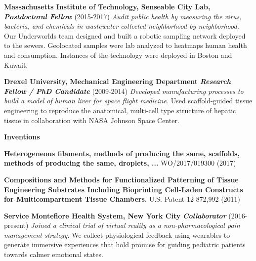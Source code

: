\documentclass[11pt]{article}
\begin{document}
\begin{singlespace}
\begin{flushleft}
\vskip 0.05in
\textbf{Massachusetts Institute of Technology, Senseable City Lab, }
\textit{ \textbf{Postdoctoral Fellow}} (2015-2017) \textit{Audit public health by measuring the virus, bacteria, and chemicals in wastewater collected neighborhood by neighborhood.} Our Underworlds team designed and built a robotic sampling network deployed to the sewers. Geolocated samples were lab analyzed to heatmaps human health and consumption. Instances of the technology were deployed in Boston and Kuwait.

\vskip 0.05in
\textbf{Drexel University, Mechanical Engineering Department}
\textit{ \textbf{Research Fellow / PhD Candidate} } (2009-2014) \textit{Developed manufacturing processes to build a model of human liver for space flight medicine.} Used scaffold-guided tissue engineering to reproduce the anatomical, multi-cell type structure of hepatic tissue in collaboration with NASA Johnson Space Center.

\vskip 0.01in \hfill \break

 \vspace{-1.5em}
\textbf{\Large Inventions}  \vspace{-1em}
\vskip 0.2in

\textbf{Heterogeneous filaments, methods of producing the same, scaffolds, methods of producing the same, droplets, ...} WO/2017/019300 (2017) \href{https://patentscope.wipo.int/search/en/detail.jsf?docId=WO2017019300}{\color{linkcolor}{https://patentscope.wipo.int/search/en/detail.jsf?docId=WO2017019300}}

\vskip 0.05in

\textbf{Compositions and Methods for Functionalized Patterning of Tissue Engineering Substrates Including Bioprinting Cell-Laden Constructs for Multicompartment Tissue Chambers.} U.S. Patent 12 872,992 (2011) \href{https://www.freepatentsonline.com/y2011/0136162.html}{\color{linkcolor}{https://www.freepatentsonline.com/y2011/0136162.html}}


\vskip 0.01in \hfill \break

 \vspace{-1.5em}

\textbf{\Large Service} \hfill \break
\textbf{Montefiore Health System, New York City} \hfill \break
\textit { \textbf{Collaborator}} (2016-present)
\textit{Joined a clinical trial of virtual reality as a non-pharmacological pain management strategy.} We collect physiological feedback using wearables to generate immersive experiences that hold promise for guiding pediatric patients towards calmer emotional states.



\end{flushleft}
\end{singlespace}
\end{document}
